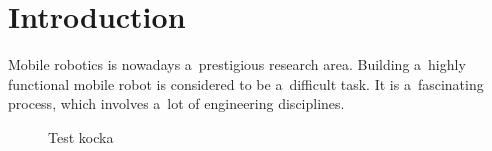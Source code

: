 \chapter{Introduction}
\label{chap:intro}
  Mobile robotics is nowadays a~prestigious research area. Building a~highly functional 
  mobile robot is considered to be a~difficult task. 
  It is a~fascinating process, which
  involves a~lot of engineering disciplines.
  

\begin{figure}
    \begin{center}
    
    \caption{Test kocka}
    \label{pic:kocka} 
    \end{center}
\end{figure}

